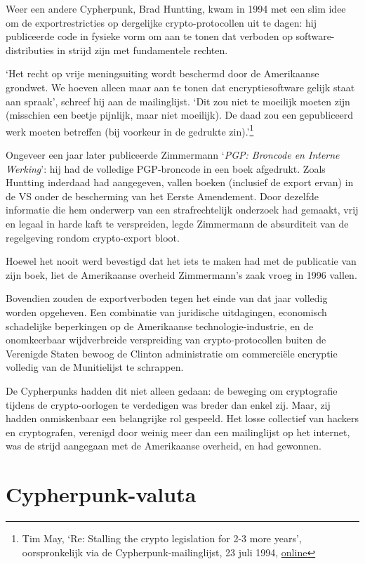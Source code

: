 \documentclass[
  a5paper,
  smalldemyvopaper,11pt,twoside,onecolumn,openright,extrafontsizes]{memoir}
\begin{document}
Weer een andere Cypherpunk, Brad Huntting, kwam in 1994 met een slim
idee om de exportrestricties op dergelijke crypto-protocollen uit te
dagen: hij publiceerde code in fysieke vorm om aan te tonen dat verboden
op software-distributies in strijd zijn met fundamentele rechten.

`Het recht op vrije meningsuiting wordt beschermd door de Amerikaanse
grondwet. We hoeven alleen maar aan te tonen dat encryptiesoftware
gelijk staat aan spraak', schreef hij aan de mailinglijst. `Dit zou niet
te moeilijk moeten zijn (misschien een beetje pijnlijk, maar niet
moeilijk). De daad zou een gepubliceerd werk moeten betreffen (bij
voorkeur in de gedrukte zin).'\footnote{Tim May, `Re: Stalling the
  crypto legislation for 2-3 more years', oorspronkelijk via de
  Cypherpunk-mailinglijst, 23 juli 1994,
  \href{https://cypherpunks.venona.com/date/1994/07/msg01245.html}{online}}

Ongeveer een jaar later publiceerde Zimmermann `\emph{PGP: Broncode en
Interne Werking}': hij had de volledige PGP-broncode in een boek
afgedrukt. Zoals Huntting inderdaad had aangegeven, vallen boeken
(inclusief de export ervan) in de VS onder de bescherming van het Eerste
Amendement. Door dezelfde informatie die hem onderwerp van een
strafrechtelijk onderzoek had gemaakt, vrij en legaal in harde kaft te
verspreiden, legde Zimmermann de absurditeit van de regelgeving rondom
crypto-export bloot.

Hoewel het nooit werd bevestigd dat het iets te maken had met de
publicatie van zijn boek, liet de Amerikaanse overheid Zimmermann's zaak
vroeg in 1996 vallen.

Bovendien zouden de exportverboden tegen het einde van dat jaar volledig
worden opgeheven. Een combinatie van juridische uitdagingen, economisch
schadelijke beperkingen op de Amerikaanse technologie-industrie, en de
onomkeerbaar wijdverbreide verspreiding van crypto-protocollen buiten de
Verenigde Staten bewoog de Clinton administratie om commerciële
encryptie volledig van de Munitielijst te schrappen.

De Cypherpunks hadden dit niet alleen gedaan: de beweging om
cryptografie tijdens de crypto-oorlogen te verdedigen was breder dan
enkel zij. Maar, zij hadden onmiskenbaar een belangrijke rol gespeeld.
Het losse collectief van hackers en cryptografen, verenigd door weinig
meer dan een mailinglijst op het internet, was de strijd aangegaan met
de Amerikaanse overheid, en had gewonnen.

\chapter{Cypherpunk-valuta}\label{cypherpunk-valuta}
\end{document}
